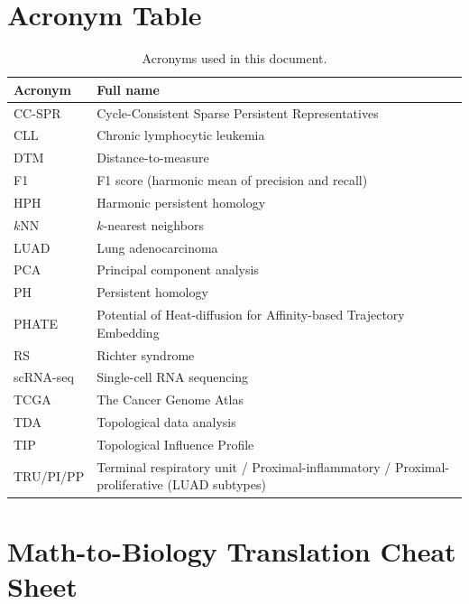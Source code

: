 \documentclass[11pt]{article}
\begin{document}
\section{Acronym Table}
\label{sec:acronyms}

\begin{table}[h]
\centering
\small
\begin{tabular}{ll}
\toprule
\textbf{Acronym} & \textbf{Full name} \\
\midrule
CC-SPR & Cycle-Consistent Sparse Persistent Representatives \\
CLL & Chronic lymphocytic leukemia \\
DTM & Distance-to-measure \\
F1 & F1 score (harmonic mean of precision and recall) \\
HPH & Harmonic persistent homology \\
$k$NN & $k$-nearest neighbors \\
LUAD & Lung adenocarcinoma \\
PCA & Principal component analysis \\
PH & Persistent homology \\
PHATE & Potential of Heat-diffusion for Affinity-based Trajectory Embedding \\
RS & Richter syndrome \\
scRNA-seq & Single-cell RNA sequencing \\
TCGA & The Cancer Genome Atlas \\
TDA & Topological data analysis \\
TIP & Topological Influence Profile \\
TRU/PI/PP & Terminal respiratory unit / Proximal-inflammatory / Proximal-proliferative (LUAD subtypes) \\
\bottomrule
\end{tabular}
\caption{Acronyms used in this document.}
\label{tab:acronyms}
\end{table}

\section{Math-to-Biology Translation Cheat Sheet}
\label{sec:cheatsheet}
\end{document}
